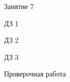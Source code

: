 \begin{class}[number=7]
	\begin{listofex}
		\item Занятие 7
	\end{listofex}
\end{class}

\begin{homework}[number=1]
	\begin{listofex}
		\item ДЗ 1
	\end{listofex}
\end{homework}

\begin{homework}[number=2]
	\begin{listofex}
		\item ДЗ 2
	\end{listofex}
\end{homework}

\begin{homework}[number=3]
	\begin{listofex}
		\item ДЗ 3
	\end{listofex}
\end{homework}

\begin{exam}
	\begin{listofex}
		\item Проверочная работа
	\end{listofex}
\end{exam}
